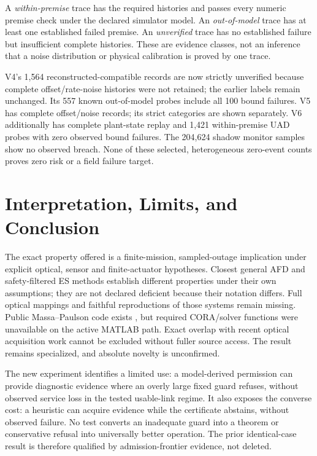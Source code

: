 \documentclass[10pt,journal]{IEEEtran}
\begin{document}
A \emph{within-premise} trace has the required histories and passes every numeric premise check under the declared simulator model. An \emph{out-of-model} trace has at least one established failed premise. An \emph{unverified} trace has no established failure but insufficient complete histories. These are evidence classes, not an inference that a noise distribution or physical calibration is proved by one trace.

V4's 1,564 reconstructed-compatible records are now strictly unverified because complete offset/rate-noise histories were not retained; the earlier labels remain unchanged. Its 557 known out-of-model probes include all 100 bound failures. V5 has complete offset/noise records; its strict categories are shown separately. V6 additionally has complete plant-state replay and 1,421 within-premise UAD probes with zero observed bound failures. The 204,624 shadow monitor samples show no observed breach. None of these selected, heterogeneous zero-event counts proves zero risk or a field failure target.

\FloatBarrier
\balance
\section{Interpretation, Limits, and Conclusion}
The exact property offered is a finite-mission, sampled-outage implication under explicit optical, sensor and finite-actuator hypotheses. Closest general AFD and safety-filtered ES methods establish different properties under their own assumptions; they are not declared deficient because their notation differs. Full optical mappings and faithful reproductions of those systems remain missing. Public Massa--Paulson code exists \cite{massacode}, but required CORA/solver functions were unavailable on the active MATLAB path. Exact overlap with recent optical acquisition work cannot be excluded without fuller source access. The result remains specialized, and absolute novelty is unconfirmed.

The new experiment identifies a limited use: a model-derived permission can provide diagnostic evidence where an overly large fixed guard refuses, without observed service loss in the tested usable-link regime. It also exposes the converse cost: a heuristic can acquire evidence while the certificate abstains, without observed failure. No test converts an inadequate guard into a theorem or conservative refusal into universally better operation. The prior identical-case result is therefore qualified by admission-frontier evidence, not deleted.
\end{document}
